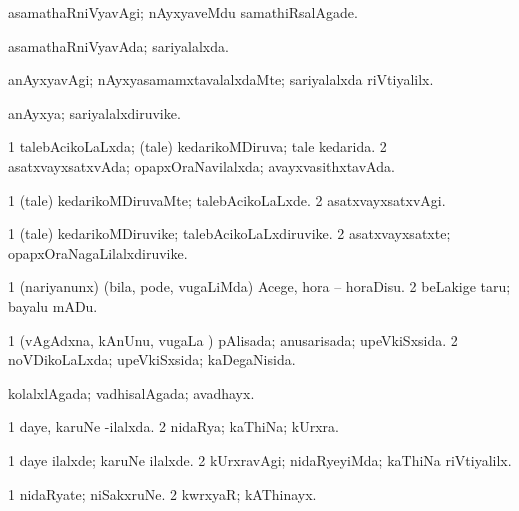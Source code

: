 \bentry
{} 
\gl{\kirxvi}
\expl{}
\bmng
asamathaRniVyavAgi; nAyxyaveMdu samathiRsalAgade. 
\emng
\eentry

\bentry
{} 
\gl{\gu}
\expl{}
\bmng
asamathaRniVyavAda; sariyalalxda. 
\emng
\eentry

\bentry
{} 
\gl{\kirxvi}
\expl{}
\bmng
anAyxyavAgi; nAyxyasamamxtavalalxdaMte; sariyalalxda riVtiyalilx. 
\emng
\eentry

\bentry
{} 
\gl{\nA}
\expl{}
\bmng
anAyxya; sariyalalxdiruvike. 
\emng
\eentry

\bentry
{} 
\gl{\gu}
\expl{}
\bmng
\bnum
\num{1} talebAcikoLaLxda; (tale) kedarikoMDiruva; tale kedarida. 
\num{2} asatxvayxsatxvAda; opapxOraNavilalxda; avayxvasithxtavAda. 
\enum
\emng
\eentry

\bentry
{} 
\gl{\kirxvi}
\expl{}
\bmng
\bnum
\num{1} (tale) kedarikoMDiruvaMte; talebAcikoLaLxde. 
\num{2} asatxvayxsatxvAgi. 
\enum
\emng
\eentry

\bentry
{} 
\gl{\nA}
\expl{}
\bmng
\bnum
\num{1} (tale) kedarikoMDiruvike; talebAcikoLaLxdiruvike. 
\num{2} asatxvayxsatxte; opapxOraNagaLilalxdiruvike. 
\enum
\emng
\eentry

\bentry
{} 
\gl{\sakirx}
\expl{}
\bmng
\bnum
\num{1} (nariyanunx) (bila, pode, \mo vugaLiMda) Acege, hora -- horaDisu. 
\num{2} beLakige taru; bayalu mADu. 
\enum
\emng
\eentry

\bentry
{} 
\gl{\gu}
\expl{}
\bmng
\bnum
\num{1} (vAgAdxna, kAnUnu, \mo vugaLa \vi) pAlisada; anusarisada; upeVkiSxsida. 
\num{2} noVDikoLaLxda; upeVkiSxsida; kaDegaNisida. 
\enum
\emng
\eentry

\bentry
{} 
\gl{\gu}
\expl{}
\bmng
kolalxlAgada; vadhisalAgada; avadhayx. 
\emng
\eentry

\bentry
{} 
\gl{\gu}
\expl{}
\bmng
\bnum
\num{1} daye, karuNe -ilalxda. 
\num{2} nidaRya; kaThiNa; kUrxra. 
\enum
\emng
\eentry

\bentry
{} 
\gl{\kirxvi}
\expl{}
\bmng
\bnum
\num{1} daye ilalxde; karuNe ilalxde. 
\num{2} kUrxravAgi; nidaRyeyiMda; kaThiNa riVtiyalilx. 
\enum
\emng
\eentry

\bentry
{} 
\gl{\nA}
\expl{}
\bmng
\bnum
\num{1} nidaRyate; niSakxruNe. 
\num{2} kwrxyaR; kAThinayx. 
\enum
\emng
\eentry


